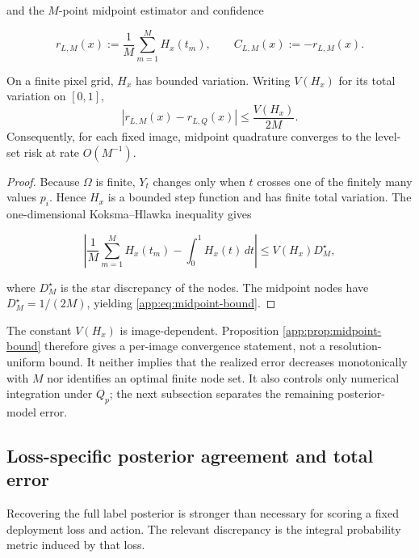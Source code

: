and the $M$-point midpoint estimator and confidence

\begin{equation}
  r_{L,M}(x):=\frac1M\sum_{m=1}^M H_x(t_m),
  \qquad
  C_{L,M}(x):=-r_{L,M}(x).
  \label{app:eq:midpoint-score}
\end{equation}

\begin{proposition}
\label{app:prop:midpoint-bound}
On a finite pixel grid, $H_x$ has bounded variation.  Writing
$V(H_x)$ for its total variation on $[0,1]$,
\begin{equation}
  \left|r_{L,M}(x)-r_{L,Q}(x)\right|
  \leq \frac{V(H_x)}{2M}.
  \label{app:eq:midpoint-bound}
\end{equation}
Consequently, for each fixed image, midpoint quadrature converges to the
level-set risk at rate $O(M^{-1})$.
\end{proposition}

\begin{proof}
Because $\Omega$ is finite, $Y_t$ changes only when $t$ crosses one of
the finitely many values $p_i$.  Hence $H_x$ is a bounded step function
and has finite total variation.  The one-dimensional
Koksma--Hlawka inequality \citep{niederreiter1992} gives

\begin{equation}
  \left|
    \frac1M\sum_{m=1}^M H_x(t_m)-\int_0^1H_x(t)\,dt
  \right|
  \leq V(H_x)D_M^\star,
\end{equation}

where $D_M^\star$ is the star discrepancy of the nodes.  The midpoint
nodes have $D_M^\star=1/(2M)$, yielding
\eqref{app:eq:midpoint-bound}.
\end{proof}

The constant $V(H_x)$ is image-dependent.  Proposition
\ref{app:prop:midpoint-bound} therefore gives a per-image convergence
statement, not a resolution-uniform bound.  It neither implies that the
realized error decreases monotonically with $M$ nor identifies an
optimal finite node set.  It also controls only numerical integration
under $Q_p$; the next subsection separates the remaining posterior-model
error.

\subsection{Loss-specific posterior agreement and total error}

Recovering the full label posterior is stronger than necessary for
scoring a fixed deployment loss and action.  The relevant discrepancy is
the integral probability metric induced by that loss.

